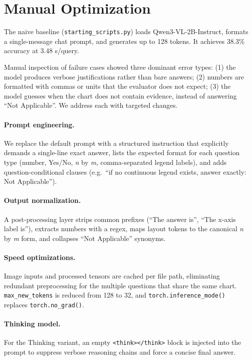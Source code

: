\documentclass{article}
\begin{document}
\section{Manual Optimization}

The naive baseline (\texttt{starting\_scripts.py}) loads Qwen3-VL-2B-Instruct,
formats a single-message chat prompt, and generates up to 128 tokens. It
achieves 38.3\% accuracy at 3.48 s/query.

Manual inspection of failure cases showed three dominant error types: (1) the
model produces verbose justifications rather than bare answers; (2) numbers are
formatted with commas or units that the evaluator does not expect; (3) the model
guesses when the chart does not contain evidence, instead of answering ``Not
Applicable''. We address each with targeted changes.

\paragraph{Prompt engineering.}
We replace the default prompt with a structured instruction that explicitly
demands a single-line exact answer, lists the expected format for each question
type (number, Yes/No, \textit{n} by \textit{m}, comma-separated legend labels),
and adds question-conditional clauses (e.g.\ ``if no continuous legend exists,
answer exactly: Not Applicable'').

\paragraph{Output normalization.}
A post-processing layer strips common prefixes (``The answer is'', ``The
x-axis label is''), extracts numbers with a regex, maps layout tokens to the
canonical \textit{n} by \textit{m} form, and collapses ``Not Applicable''
synonyms.

\paragraph{Speed optimizations.}
Image inputs and processed tensors are cached per file path, eliminating
redundant preprocessing for the multiple questions that share the same chart.
\texttt{max\_new\_tokens} is reduced from 128 to 32, and
\texttt{torch.inference\_mode()} replaces \texttt{torch.no\_grad()}.

\paragraph{Thinking model.}
For the Thinking variant, an empty \texttt{<think></think>} block is injected
into the prompt to suppress verbose reasoning chains and force a concise final
answer.
\end{document}
